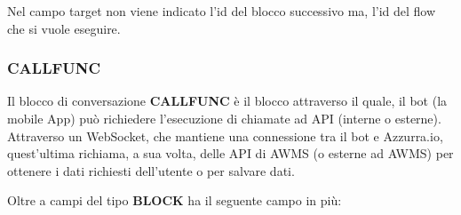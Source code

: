 
Nel campo target non viene indicato l'id del blocco successivo ma, l'id del flow che si vuole eseguire.

\subsubsection{CALLFUNC}

Il blocco di conversazione \textbf{CALLFUNC} è il blocco attraverso il quale, il bot (la mobile App) può richiedere l’esecuzione di chiamate ad API (interne o esterne). Attraverso un WebSocket, che mantiene una connessione tra il bot e Azzurra.io, quest’ultima richiama, a sua volta, delle API di AWMS (o esterne ad AWMS) per ottenere i dati richiesti dell’utente o per salvare dati. 


Oltre a campi del tipo \textbf{BLOCK} ha il seguente campo in più:

